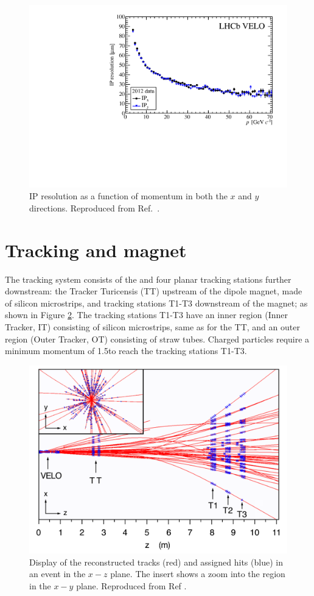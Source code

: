 \begin{figure}
\centering
\includegraphics[width=0.5\linewidth]{figures/detector/IPRes-Vs-P-CompareIPxIPy-2012.pdf}
\caption{IP resolution as a function of momentum in both the $x$ and $y$ directions. Reproduced from Ref.~\cite{LHCb-DP-2014-001}.}
\label{veloperformance}
\end{figure}

\section{Tracking and magnet}
\label{sec:detector:tracking}

The \lhcb tracking system consists of the \velo and four planar tracking stations further downstream: the Tracker Turicensis (TT) upstream of the dipole magnet, made of silicon microstrips, and tracking stations T1-T3 downstream of the magnet; as shown in Figure \ref{tracking}. The tracking stations T1-T3 have an inner region (Inner Tracker, IT) consisting of silicon microstrips, same as for the TT, and an outer region (Outer Tracker, OT) consisting of straw tubes. Charged particles require a minimum momentum of 1.5\gevc to reach the tracking stations T1-T3.

\begin{figure}
\centering
\includegraphics[width=0.7\linewidth]{figures/detector/tracking.pdf}
\caption{Display of the reconstructed tracks (red) and assigned hits (blue) in an event in the $x-z$ plane. The insert shows a zoom into the \velo region in the $x-y$ plane. Reproduced from Ref \cite{LHCb-DP-2014-002}.}
\label{tracking}
\end{figure}

